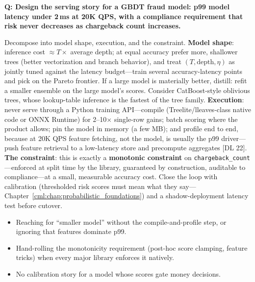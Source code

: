 \begin{interviewq}
\textbf{Q: Design the serving story for a GBDT fraud model: p99 model latency under 2\,ms at 20K QPS, with a compliance requirement that risk never decreases as chargeback count increases.}

 \quad {} \quad \badgefreq{\freqlow}

\stronganswer

Decompose into model shape, execution, and the constraint. \textbf{Model shape}: inference cost $\approx T \times$ average depth; at equal accuracy prefer more, shallower trees (better vectorization and branch behavior), and treat $(T, \text{depth}, \eta)$ as jointly tuned against the latency budget---train several accuracy-latency points and pick on the Pareto frontier. If a large model is materially better, distill: refit a smaller ensemble on the large model's scores. Consider CatBoost-style oblivious trees, whose lookup-table inference is the fastest of the tree family. \textbf{Execution}: never serve through a Python training API---compile (Treelite/lleaves-class native code or ONNX Runtime) for 2--10$\times$ single-row gains; batch scoring where the product allows; pin the model in memory (a few MB); and profile end to end, because at 20K QPS feature fetching, not the model, is usually the p99 driver---push feature retrieval to a low-latency store and precompute aggregates [DL 22]. \textbf{The constraint}: this is exactly a \textbf{monotonic constraint} on \texttt{chargeback\_count}---enforced at split time by the library, guaranteed by construction, auditable to compliance---at a small, measurable accuracy cost. Close the loop with calibration (thresholded risk scores must mean what they say---Chapter~\ref{cml:chap:probabilistic_foundations}) and a shadow-deployment latency test before cutover.

\redflags
\begin{itemize}
    \item Reaching for ``smaller model'' without the compile-and-profile step, or ignoring that features dominate p99.
    \item Hand-rolling the monotonicity requirement (post-hoc score clamping, feature tricks) when every major library enforces it natively.
    \item No calibration story for a model whose scores gate money decisions.
\end{itemize}



\end{interviewq}

